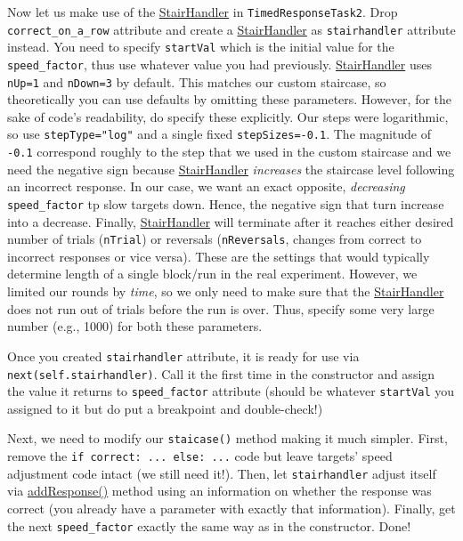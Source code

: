 \documentclass[
]{book}
\begin{document}
Now let us make use of the \href{https://psychopy.org/api/data.html\#stairhandler}{StairHandler} in \texttt{TimedResponseTask2}. Drop \texttt{correct\_on\_a\_row} attribute and create a \href{https://psychopy.org/api/data.html\#stairhandler}{StairHandler} as \texttt{stairhandler} attribute instead. You need to specify \texttt{startVal} which is the initial value for the \texttt{speed\_factor}, thus use whatever value you had previously. \href{https://psychopy.org/api/data.html\#stairhandler}{StairHandler} uses \texttt{nUp=1} and \texttt{nDown=3} by default. This matches our custom staircase, so theoretically you can use defaults by omitting these parameters. However, for the sake of code's readability, do specify these explicitly. Our steps were logarithmic, so use \texttt{stepType="log"} and a single fixed \texttt{stepSizes=-0.1}. The magnitude of \texttt{-0.1} correspond roughly to the step that we used in the custom staircase and we need the negative sign because \href{https://psychopy.org/api/data.html\#stairhandler}{StairHandler} \emph{increases} the staircase level following an incorrect response. In our case, we want an exact opposite, \emph{decreasing} \texttt{speed\_factor} tp slow targets down. Hence, the negative sign that turn increase into a decrease. Finally, \href{https://psychopy.org/api/data.html\#stairhandler}{StairHandler} will terminate after it reaches either desired number of trials (\texttt{nTrial}) or reversals (\texttt{nReversals}, changes from correct to incorrect responses or vice versa). These are the settings that would typically determine length of a single block/run in the real experiment. However, we limited our rounds by \emph{time}, so we only need to make sure that the \href{https://psychopy.org/api/data.html\#stairhandler}{StairHandler} does not run out of trials before the run is over. Thus, specify some very large number (e.g., 1000) for both these parameters.

Once you created \texttt{stairhandler} attribute, it is ready for use via \texttt{next(self.stairhandler)}. Call it the first time in the constructor and assign the value it returns to \texttt{speed\_factor} attribute (should be whatever \texttt{startVal} you assigned to it but do put a breakpoint and double-check!)

Next, we need to modify our \texttt{staicase()} method making it much simpler. First, remove the \texttt{if\ correct:\ ...\ else:\ ...} code but leave targets' speed adjustment code intact (we still need it!). Then, let \texttt{stairhandler} adjust itself via \href{https://psychopy.org/api/data.html\#psychopy.data.StairHandler.addResponse}{addResponse()} method using an information on whether the response was correct (you already have a parameter with exactly that information). Finally, get the next \texttt{speed\_factor} exactly the same way as in the constructor. Done!
\end{document}

